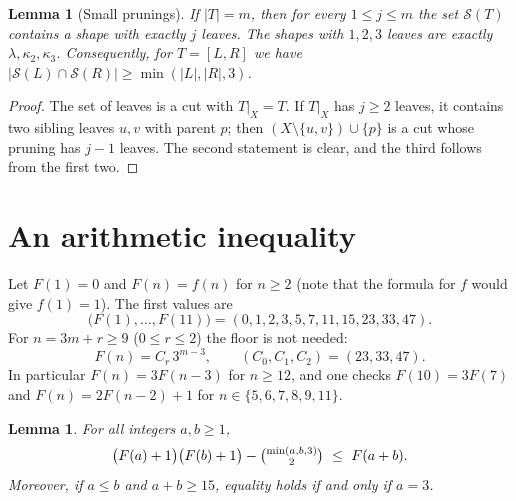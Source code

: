 \documentclass[11pt]{amsart}
\newtheorem{lemma}[theorem]{Lemma}
\theoremstyle{definition}
\theoremstyle{remark}
\newcommand{\lf}{\lambda}
\newcommand{\Sh}{\mathcal{S}}
\newcommand{\binomtwo}[1]{\tbinom{#1}{2}}
\begin{document}
\begin{lemma}[Small prunings]\label{lem:small}
If $|T|=m$, then for every $1\le j\le m$ the set $\Sh(T)$ contains a shape with exactly $j$ leaves.
The shapes with $1,2,3$ leaves are exactly $\lf,\kappa_2,\kappa_3$.
Consequently, for $T=[L,R]$ we have $|\Sh(L)\cap\Sh(R)|\ge\min(|L|,|R|,3)$.
\end{lemma}

\begin{proof}
The set of leaves is a cut with $T|_X=T$.
If $T|_X$ has $j\ge 2$ leaves, it contains two sibling leaves $u,v$ with parent $p$; then $(X\setminus\{u,v\})\cup\{p\}$ is a cut whose pruning has $j-1$ leaves.
The second statement is clear, and the third follows from the first two.
\end{proof}

\section{An arithmetic inequality}\label{sec:arith}

Let $F(1)=0$ and $F(n)=f(n)$ for $n\ge 2$ (note that the formula for $f$ would give $f(1)=1$).
The first values are
\[
\bigl(F(1),\dots,F(11)\bigr)=(0,1,2,3,5,7,11,15,23,33,47).
\]
For $n=3m+r\ge 9$ ($0\le r\le 2$) the floor is not needed:
\begin{equation}\label{eq:closed}
F(n)=C_r\,3^{m-3},\qquad (C_0,C_1,C_2)=(23,33,47).
\end{equation}
In particular $F(n)=3F(n-3)$ for $n\ge 12$, and one checks $F(10)=3F(7)$ and $F(n)=2F(n-2)+1$ for $n\in\{5,6,7,8,9,11\}$.

\begin{lemma}\label{lem:arith}
For all integers $a,b\ge 1$,
\begin{equation}\label{eq:arith}
\bigl(F(a)+1\bigr)\bigl(F(b)+1\bigr)-\binomtwo{\min(a,b,3)}\ \le\ F(a+b).
\end{equation}
Moreover, if $a\le b$ and $a+b\ge 15$, equality holds if and only if $a=3$.
\end{lemma}
\end{document}
